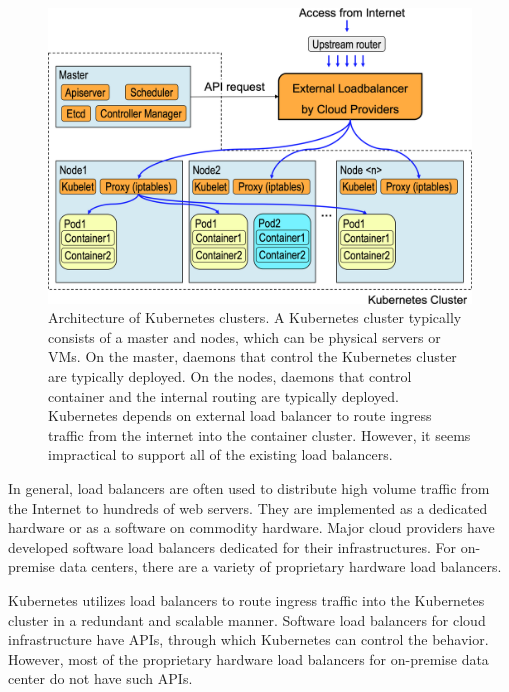 \begin{figure}[h]
  \centering
  \includegraphics[width=0.8\columnwidth]{Figs/K8sConventional}
  
  \centering
  
  \begin{minipage}{0.9\columnwidth}
    \caption[Architecture of Kubernetes clusters]{
      Architecture of Kubernetes clusters.
      A Kubernetes cluster typically consists of a master and nodes, which can be physical servers or VMs.
      On the master, daemons that control the Kubernetes cluster are typically deployed. 
      On the nodes,  daemons that control container and the internal routing are typically deployed.
      Kubernetes depends on external load balancer to route ingress traffic from the internet into the container cluster.
      However, it seems impractical to support all of the existing load balancers.
    }
    \label{fig:k8s_intro}
  \end{minipage}
  
\end{figure}

In general, load balancers are often used to distribute high volume traffic from the Internet to hundreds of web servers.
They are implemented as a dedicated hardware or as a software on commodity hardware.
Major cloud providers have developed software load balancers \cite{eisenbud2016maglev,patel2013ananta} dedicated for their infrastructures.
For on-premise data centers, there are a variety of proprietary hardware load balancers.

Kubernetes utilizes load balancers to route ingress traffic into the Kubernetes cluster in a redundant and scalable manner. 
Software load balancers for cloud infrastructure have APIs, through which Kubernetes can control the behavior.
However, most of the proprietary hardware load balancers for on-premise data center do not have such APIs.

